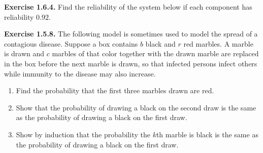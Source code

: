 \documentclass{article}
\theoremstyle{remark}
\newlength{\subsecindent}
\newenvironment{secbody}{%
  \begin{list}{}{%
    \setlength{\leftmargin}{\subsecindent}%
    \setlength{\rightmargin}{0pt}%
    \setlength{\topsep}{0pt}%
    \setlength{\partopsep}{0pt}%
    \setlength{\parsep}{\parskip}%
    \setlength{\itemsep}{\parskip}%
  }\item\relax
}{\end{list}}
\begin{document}
\begin{secbody}

\textbf{Exercise 1.6.4.} \;
Find the reliability of the system below if each component has
reliability $0.92$.

\begin{center}
\end{center}

\bigskip
\textbf{Exercise 1.5.8.} \;
The following model is sometimes used to model the spread of a
contagious disease. Suppose a box contains $b$ black and $r$ red
marbles. A marble is drawn and $c$ marbles of that color together with
the drawn marble are replaced in the box before the next marble is
drawn, so that infected persons infect others while immunity to the
disease may also increase.
\begin{enumerate}
  \item[(a)] Find the probability that the first three marbles drawn
             are red.
  \item[(b)] Show that the probability of drawing a black on the second
             draw is the same as the probability of drawing a black on
             the first draw.
  \item[(c)] Show by induction that the probability the $k$th marble is
             black is the same as the probability of drawing a black on
             the first draw.
\end{enumerate}


\end{secbody}
\end{document}
